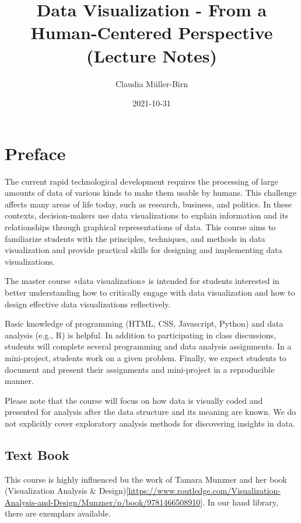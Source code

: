 \documentclass[
]{book}
\title{Data Visualization - From a Human-Centered Perspective (Lecture Notes)}
\author{Claudia Müller-Birn}
\date{2021-10-31}
\begin{document}
\maketitle

{
\setcounter{tocdepth}{1}
\tableofcontents
}
\hypertarget{preface}{%
\chapter*{Preface}\label{preface}}

The current rapid technological development requires the processing of large amounts of data of various kinds to make them usable by humans. This challenge affects many areas of life today, such as research, business, and politics. In these contexts, decision-makers use data visualizations to explain information and its relationships through graphical representations of data. This course aims to familiarize students with the principles, techniques, and methods in data visualization and provide practical skills for designing and implementing data visualizations.

The master course «data visualization» is intended for students interested in better understanding how to critically engage with data visualization and how to design effective data visualizations reflectively.

Basic knowledge of programming (HTML, CSS, Javascript, Python) and data analysis (e.g., R) is helpful. In addition to participating in class discussions, students will complete several programming and data analysis assignments. In a mini-project, students work on a given problem. Finally, we expect students to document and present their assignments and mini-project in a reproducible manner.

Please note that the course will focus on how data is visually coded and presented for analysis after the data structure and its meaning are known. We do not explicitly cover exploratory analysis methods for discovering insights in data.

\hypertarget{text-book}{%
\section*{Text Book}\label{text-book}}

This course is highly influenced bu the work of Tamara Munzner and her book (Visualization Analysis \& Design){[}\url{https://www.routledge.com/Visualization-Analysis-and-Design/Munzner/p/book/9781466508910}{]}. In our hand library, there are exemplars available.
\end{document}
